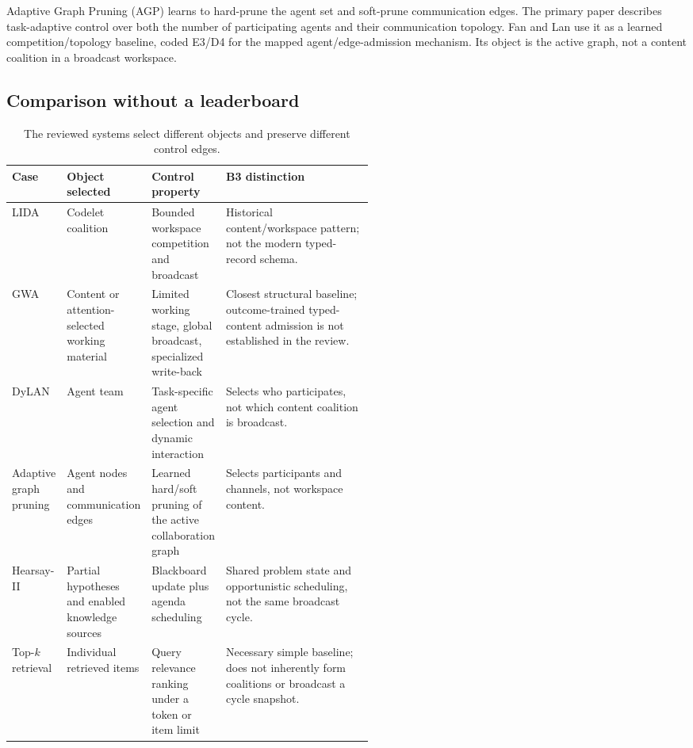 Adaptive Graph Pruning (AGP) learns to hard-prune the agent set and soft-prune communication edges. The primary paper describes task-adaptive control over both the number of participating agents and their communication topology. Fan and Lan use it as a learned competition/topology baseline, coded E3/D4 for the mapped agent/edge-admission mechanism. Its object is the active graph, not a content coalition in a broadcast workspace.\autocite{li2025adaptivegraphpruning}

\subsection{Comparison without a leaderboard}

\begin{table}[tbp]
\centering
\small
\caption{The reviewed systems select different objects and preserve different control edges.}
\label{tab:ch14-baselines}
\begin{tabularx}{\linewidth}{@{}P{0.15\linewidth}P{0.18\linewidth}P{0.20\linewidth}X@{}}
\toprule
\textbf{Case} & \textbf{Object selected} & \textbf{Control property} & \textbf{B3 distinction} \\
\midrule
LIDA & Codelet coalition & Bounded workspace competition and broadcast & Historical content/workspace pattern; not the modern typed-record schema. \\
GWA & Content or attention-selected working material & Limited working stage, global broadcast, specialized write-back & Closest structural baseline; outcome-trained typed-content admission is not established in the review. \\
DyLAN & Agent team & Task-specific agent selection and dynamic interaction & Selects who participates, not which content coalition is broadcast. \\
Adaptive graph pruning & Agent nodes and communication edges & Learned hard/soft pruning of the active collaboration graph & Selects participants and channels, not workspace content. \\
Hearsay-II & Partial hypotheses and enabled knowledge sources & Blackboard update plus agenda scheduling & Shared problem state and opportunistic scheduling, not the same broadcast cycle. \\
Top-$k$ retrieval & Individual retrieved items & Query relevance ranking under a token or item limit & Necessary simple baseline; does not inherently form coalitions or broadcast a cycle snapshot. \\
\bottomrule
\end{tabularx}
\end{table}

